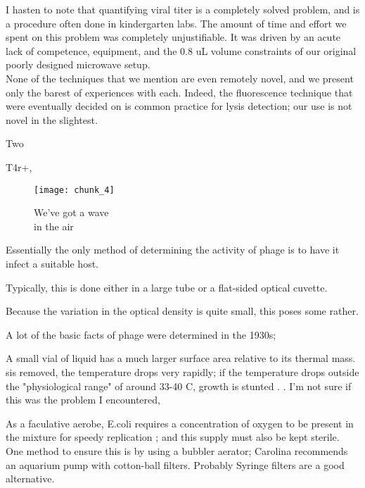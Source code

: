 \documentclass[paper.tex]{subfiles}
\begin{document}
\begin{autem}
	I hasten to note that quantifying viral titer is a completely solved problem, and is a procedure often done in kindergarten labs. The amount of time and effort we spent on this problem was completely unjustifiable. It was driven by an acute lack of competence, equipment, and the 0.8 uL volume constraints of our original poorly designed microwave setup.\\
	
	None of the techniques that we mention are even remotely novel, and we present only the barest of experiences with each.
	Indeed, the fluorescence technique that were eventually decided on is common practice for lysis detection; our use is not novel in the slightest.
\end{autem}

Two 

T4r+,



\begin{figure}[H]
	\captionsetup{singlelinecheck = false, justification=justified}
	\centering
	\texttt{[image: chunk\_4]}
	\caption{
		We've got a wave\\
		in the air}
\end{figure}

Essentially the only method of determining the activity of phage is to have it infect a suitable host.

Typically, this is done either in a large tube or a flat-sided optical cuvette.

Because the variation in the optical density is quite small, this poses some rather. 

A lot of the basic facts of phage were determined in the 1930s; 

A small vial of liquid has a much larger surface area relative to its thermal mass. sis removed, the temperature drops very rapidly; if the temperature drops outside the "physiological range" of around 33-40 C, growth is stunted \cite{effect2003}. \cite{growth1946}. I'm not sure if this was the problem I encountered, 

As a faculative aerobe, E.coli requires a concentration of oxygen to be present in the mixture for speedy replication \cite{Effect1965}; and this supply must also be kept sterile. One method to ensure this is by using a bubbler aerator; Carolina recommends an aquarium pump with cotton-ball filters. Probably Syringe filters are a good alternative.
\end{document}
